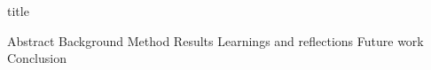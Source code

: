 \documentclass[10pt]{article}
\begin{document}
{title}

\frontmatter

\tableofcontents


\mainmatter
\begin{multicols}{2}
{Abstract}
{Background}
{Method}
{Results}
{Learnings and reflections}
{Future work}
{Conclusion}
\newpage
\end{multicols}
\printbibliography[heading = bibintoc]    %

\end{document}
